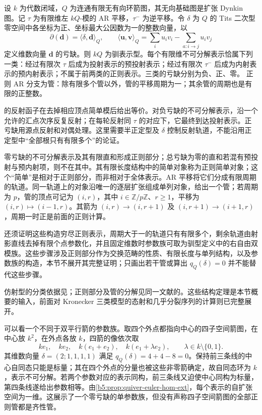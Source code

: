 \begin{theorem}[仿射箭图的表示型]\label{b5:thm:affine-quiver-type}
	设 \(k\) 为代数闭域，\(Q\) 为连通有限无有向环箭图，其无向基础图是扩张 Dynkin 图。记 \(\tau\) 为有限维左 \(kQ\)-模的 AR 平移，\(\tau^{-}\) 为逆平移。令 \(\delta\) 为 \(Q\) 的 Tits 二次型零空间中各坐标为正、坐标最大公因数为一的整数向量，以
	\[
		\partial(\mathbf d)=\langle\delta,\mathbf d\rangle_Q,
		\qquad \langle\mathbf u,\mathbf v\rangle_Q
		=\sum_i u_iv_i-\sum_{a:i\to j}u_iv_j
	\]
	定义维数向量 \(\mathbf d\) 的亏缺。则 \(kQ\) 为驯表示型。每个有限维不可分解表示恰属下列一类：经过有限次 \(\tau\) 后成为投射表示的预投射表示；经过有限次 \(\tau^{-}\) 后成为内射表示的预内射表示；不属于前两类的正则表示。三类的亏缺分别为负、正、零。
	正则 AR 分支为管：除有限多个管以外，管的平移周期为一；其余管的周期也是有限的正整数。
\end{theorem}
\begin{proofsketch}
	的反射函子在去掉相应顶点简单模后给出等价。对负亏缺的不可分解表示，沿一个允许的汇点次序反复反射；在每轮反射同 \(\tau\) 的对应下，它最终到达投射表示。正亏缺用源点反射和对偶处理。这里需要半正定型及 \(\delta\) 控制反射轨道，不能沿用正定型中“全部根只有有限多个”的论证。

	零亏缺的不可分解表示及其有限直和形成正则部分；总亏缺为零的直和若混有预投射与预内射项，则不在其中。其有限长度结构中的简单对象称为正则简单对象；这个“简单”是相对于正则部分，而非相对于全体表示。AR 平移将它们分成有限周期的轨道。同一轨道上的对象沿唯一的逐层扩张组成单列对象，给出一个管；若周期为 \(p\)，管的顶点可记为 \((i,r)\)，其中 \(i\in\mathbb Z/p\mathbb Z\)、\(r\ge1\)，平移为 \((i,r)\mapsto(i-1,r)\)。其箭为 \((i,r)\to(i,r+1)\) 及 \((i,r+1)\to(i+1,r)\)，周期一时正是前面的正则计算。

	还须证明这些构造穷尽正则表示，周期大于一的轨道只有有限多个，剩余轨道由射影直线去掉有限个点参数化，并且固定维数时参数族可取为驯型定义中的右自由双模族。这些步骤涉及正则部分作为交换范畴的性质、有限长度与单列结构，以及参数族的构造，本节不展开其完整证明；只画出若干管或算出 \(q_Q(\delta)=0\) 并不能替代这些步骤。
\end{proofsketch}
仿射型的分类依据见\cite[作者公开稿, Section 3.2, Theorem 3.10]{Schiffmann2012HallAlgebras}；正则部分及管的分解见同一文献的\cite[作者公开稿, Section 3.6, Propositions 3.31--3.32 and Theorem 3.33]{Schiffmann2012HallAlgebras}。这些结构定理是本节概要的输入，前面对 Kronecker 三类模型的态射和几乎分裂序列的计算则已完整展开。

\ProseParagraphBreak
可以看一个不同于双平行箭的参数族。取四个外点都指向中心的四子空间箭图，在中心放 \(k^2\)，在外点各放 \(k\)，四箭的像依次取
\[
	ke_1,\quad ke_2,\quad k(e_1+e_2),\quad k(e_1+\lambda e_2),
	\qquad \lambda\in k\setminus\{0,1\}.
\]
其维数向量 \(\delta=(2;1,1,1,1)\) 满足 \(q_Q(\delta)=4+4-8=0\)。保持前三条线的中心自同态只能是标量；其在四个外点的分量也被这些非零箭确定，故自同态环为 \(k\)，表示不可分解。若两个参数对应的表示同构，前三条线又迫使中心同构为标量，第四条线遂给出参数相等。由\cref{b5:prop:quiver-euler-hom-ext}，每个表示的自扩张空间为一维。这展示了一个零亏缺的单参数族，但没有声称四子空间箭图的全部正则管都是齐性管。

